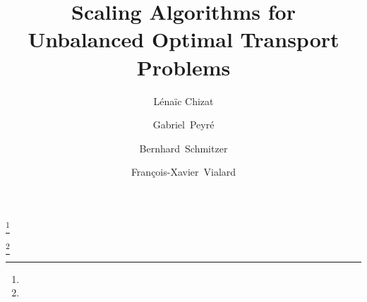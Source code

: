 \documentclass{mcom-l}
\theoremstyle{definition}
\begin{document}
\title[Scaling Algorithms for Unbalanced Optimal Transport Problems]{Scaling Algorithms for\\Unbalanced Optimal Transport Problems}


\author[L. Chizat]{L\'ena\"ic Chizat}
\address{CEREMADE, CNRS, Universit\'e Paris-Dauphine, INRIA Project team Mokaplan}
\curraddr{}
\thanks{}

\author[G. Peyr\'e]{Gabriel~Peyr\'e}
\address{CNRS and DMA, \'Ecole Normale Sup\'erieure, INRIA Project team Mokaplan}
\curraddr{}
\thanks{}


\author[B. Schmitzer]{Bernhard~Schmitzer}

\author[F-X. Vialard]{Fran\c cois-Xavier~Vialard}




\date{}

\dedicatory{}



\maketitle










\appendix






\end{document}
